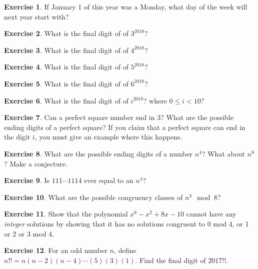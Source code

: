 \documentclass[11pt]{article}
\theoremstyle{definition}
\newtheorem{exercise}{Exercise}
\numberwithin{thm}{section}
\begin{document}
\begin{exercise} If January 1 of this year was a Monday, what day of the week will next year start with?
\end{exercise}

\begin{exercise} What is the final digit of of $3^{2018}$?
\end{exercise}

\begin{exercise} What is the final digit of of $4^{2018}$?
\end{exercise}

\begin{exercise} What is the final digit of of $5^{2018}$?
\end{exercise}

\begin{exercise} What is the final digit of of $6^{2018}$?
\end{exercise}

\begin{exercise} What is the final digit of of $i^{2018}$? where $0\leq i < 10$?
\end{exercise}

\begin{exercise} Can a perfect square number end in $3$? What are the possible ending digits of a perfect square? If you claim that a perfect square can end in the digit $i$, you must give an example where this happens.
\end{exercise}

\begin{exercise} What are the possible ending digits of a number $n^4$? What about $n^8$? Make a conjecture.
\end{exercise}

\begin{exercise} Is $111 \cdots 1114$ ever equal to an $n^4$?
\end{exercise}

\begin{exercise} What are the possible congruency classes of $n^3 \mod 8$?
\end{exercise}

\begin{exercise} Show that the polynomial $x^6 - x^2 + 8x - 10$ cannot have any \textit{integer} solutions by showing that it has no solutions congruent to $0$ mod 4, or 1 or 2 or 3 mod 4.
\end{exercise}

\begin{exercise} For an odd number $n$, define $n!! = n(n-2)(n-4)\cdots(5)(3)(1)$. Find the final digit of $2017!!$.
\end{exercise}
\end{document}
